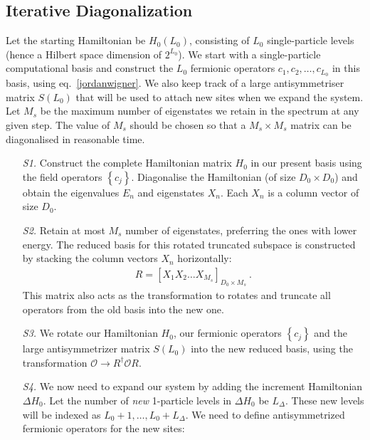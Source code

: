\documentclass[reprint]{revtex4-2}
\begin{document}
\subsection{Iterative Diagonalization}
Let the starting Hamiltonian be \(H_0(L_0)\), consisting of \(L_0\) single-particle levels (hence a Hilbert space dimension of \(2^{L_0}\)). We start with a single-particle computational basis and construct the \(L_0\) fermionic operators \(c_1, c_2, \ldots, c_{L_0}\) in this basis, using eq.~\ref{jordanwigner}. We also keep track of a large antisymmetriser matrix \(S(L_0)\) that will be used to attach new sites when we expand the system. Let \(M_s\) be the maximum number of eigenstates we retain in the spectrum at any given step. The value of \(M_s\) should be chosen so that a \(M_s\times M_s\) matrix can be diagonalised in reasonable time.
\begin{itemize}
	\item[{\it S1.}] Construct the complete Hamiltonian matrix \(H_0\) in our present basis using the field operators \(\left\{c_j\right\}\). Diagonalise the Hamiltonian (of size \(D_0 \times D_0\)) and obtain the eigenvalues \({E_n}\) and eigenstates \({X_n}\). Each \(X_n\) is a column vector of size \(D_0\).
	\item[{\it S2.}] Retain at most \(M_s\) number of eigenstates, preferring the ones with lower energy. The reduced basis for this rotated truncated subspace is constructed by stacking the column vectors \(X_n\) horizontally:
		\begin{equation}\begin{aligned}
			R = [X_1 X_2 \ldots X_{M_s}]_{D_0\times M_s}~.
		\end{aligned}\end{equation}
		This matrix also acts as the transformation to rotates and truncate all operators from the old basis into the new one.
	\item[{\it S3.}] We rotate our Hamiltonian \(H_0\), our fermionic operators \(\left\{ c_j \right\} \) and the large antisymmetrizer matrix \(S(L_0)\) into the new reduced basis, using the transformation \(\mathcal{O} \to R^\dagger \mathcal{O} R\).
	\item[{\it S4.}] We now need to expand our system by adding the increment Hamiltonian \(\Delta H_0\). Let the number of {\it new } 1-particle levels in \(\Delta H_0\) be \(L_\Delta\). These new levels will be indexed as \(L_0+1,\ldots,L_0+L_\Delta\). We need to define antisymmetrized fermionic operators for the new sites:
		\begin{equation}\begin{aligned}

\end{aligned}
\end{equation}
\end{itemize}
\end{document}

